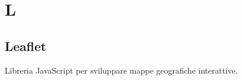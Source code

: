 \section*{L}
\markright{}
\subsection*{Leaflet}
Libreria JavaScript per sviluppare mappe geografiche interattive.
